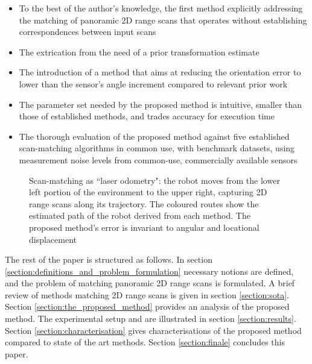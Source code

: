 \begin{itemize}
  \item To the best of the author's knowledge, the first method explicitly
        addressing the matching of panoramic 2D range scans that operates
        without establishing correspondences between input scans
  \item The extrication from the need of a prior transformation estimate
  \item The introduction of a method that aims at reducing the orientation
        error to lower than the sensor's angle increment compared to relevant
        prior work
  \item The parameter set needed by the proposed method is intuitive, smaller
        than those of established methods, and trades accuracy for execution
        time
  \item The thorough evaluation of the proposed method against five established
        scan-matching algorithms in common use, with benchmark datasets,
        using measurement noise levels from common-use, commercially available
        sensors
\end{itemize}

\begin{figure}[]\centering
  \vspace{-1.3cm}
  
  \vspace{-2cm}
  \caption{\small Scan-matching as ``laser odometry": the robot moves from the
           lower left portion of the environment to the upper right, capturing
           2D range scans along its trajectory. The coloured routes show the
           estimated path of the robot derived from each method. The proposed
           method's error is invariant to angular and locational displacement}
  \label{fig:laser_odometry}
\end{figure}

The rest of the paper is structured as follows. In section
\ref{section:definitions_and_problem_formulation} necessary notions are
defined, and the problem of matching panoramic 2D range scans is formulated. A
brief review of methods matching 2D range scans is given in section
\ref{section:sota}. Section \ref{section:the_proposed_method} provides an
analysis of the proposed method. The experimental setup and are illustrated in
section \ref{section:results}. Section \ref{section:characterisation} gives
characterisations of the proposed method compared to state of the art methods.
Section \ref{section:finale} concludes this paper.
